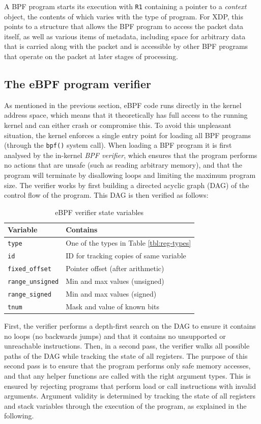 \documentclass[10pt,sigconf]{acmart}
\begin{document}
A BPF program starts its execution with \texttt{R1} containing a pointer to a \emph{context}
object, the contents of which varies with the type of program. For XDP, this
points to a structure that allows the BPF program to access the packet data
itself, as well as various items of metadata, including space for arbitrary data
that is carried along with the packet and is accessible by other BPF programs
that operate on the packet at later stages of processing.


\subsection{The eBPF program verifier}
\label{sec:bpf-verifier}
As mentioned in the previous section, eBPF code runs directly in the kernel
address space, which means that it theoretically has full access to the running
kernel and can either crash or compromise this. To avoid this unpleasant
situation, the kernel enforces a single entry point for loading all BPF programs
(through the \texttt{bpf()} system call). When loading a BPF program it is first
analysed by the in-kernel \emph{BPF verifier}, which ensures that the program
performs no actions that are unsafe (such as reading arbitrary memory), and that
the program will terminate by disallowing loops and limiting the maximum program
size. The verifier works by first building a directed acyclic graph (DAG) of the
control flow of the program. This DAG is then verified as follows:

\begin{table}[tbp]
\caption{\label{tbl:vrf-state-vars}
eBPF verifier state variables}
\centering
\begin{tabular}{ll}
\toprule
Variable & Contains\\
\midrule
\texttt{type} & One of the types in Table \ref{tbl:reg-types}\\
\texttt{id} & ID for tracking copies of same variable\\
\texttt{fixed\_offset} & Pointer offset (after arithmetic)\\
\texttt{range\_unsigned} & Min and max values (unsigned)\\
\texttt{range\_signed} & Min and max values (signed)\\
\texttt{tnum} & Mask and value of known bits\\
\bottomrule
\end{tabular}
\end{table}

First, the verifier performs a depth-first search on the DAG to ensure it
contains no loops (no backwards jumps) and that it contains no unsupported or
unreachable instructions. Then, in a second pass, the verifier walks all
possible paths of the DAG while tracking the state of all registers. The purpose
of this second pass is to ensure that the program performs only safe memory
accesses, and that any helper functions are called with the right argument
types. This is ensured by rejecting programs that perform load or call
instructions with invalid arguments. Argument validity is determined by tracking
the state of all registers and stack variables through the execution of the
program, as explained in the following.
\end{document}
